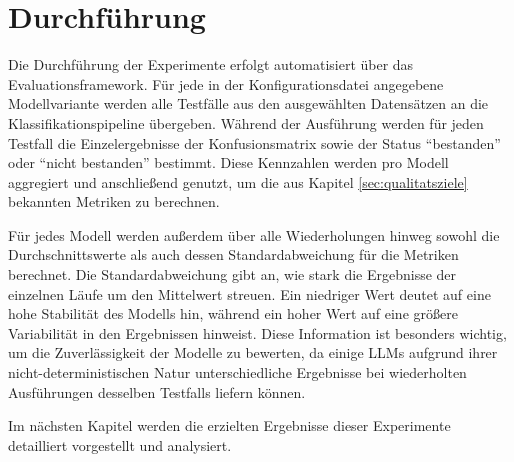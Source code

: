 \section{Durchführung}\label{sec:durchfuhrung}

Die Durchführung der Experimente erfolgt automatisiert über das Evaluationsframework.  Für jede in der Konfigurationsdatei angegebene Modellvariante werden alle Testfälle aus den ausgewählten Datensätzen an die Klassifikationspipeline übergeben. Während der Ausführung werden für jeden Testfall die Einzelergebnisse der Konfusionsmatrix sowie der Status \enquote{bestanden} oder \enquote{nicht bestanden} bestimmt. Diese Kennzahlen werden pro Modell aggregiert und anschließend genutzt, um die aus Kapitel \ref{sec:qualitatsziele} bekannten Metriken zu berechnen.

Für jedes Modell werden außerdem über alle Wiederholungen hinweg sowohl die Durchschnittswerte als auch dessen Standardabweichung für die Metriken berechnet. Die Standardabweichung gibt an, wie stark die Ergebnisse der einzelnen Läufe um den Mittelwert streuen. Ein niedriger Wert deutet auf eine hohe Stabilität des Modells hin, während ein hoher Wert auf eine größere Variabilität in den Ergebnissen hinweist. Diese Information ist besonders wichtig, um die Zuverlässigkeit der Modelle zu bewerten, da einige \acp{LLM} aufgrund ihrer nicht-deterministischen Natur unterschiedliche Ergebnisse bei wiederholten Ausführungen desselben Testfalls liefern können.

Im nächsten Kapitel werden die erzielten Ergebnisse dieser Experimente detailliert vorgestellt und analysiert.